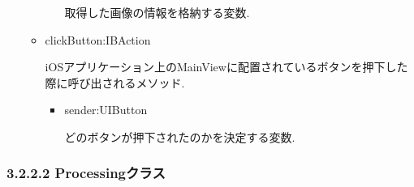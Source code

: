 \begin{itemize}
\begin{itemize}
\begin{itemize}
取得した画像の情報を格納する変数.
\end{itemize}

\item clickButton:IBAction

iOSアプリケーション上のMainViewに配置されているボタンを押下した際に呼び出されるメソッド.

\begin{itemize}
\item sender:UIButton

どのボタンが押下されたのかを決定する変数.
\end{itemize}

\end{itemize}

\end{itemize}

\subsubsection{3.2.2.2 Processingクラス}
